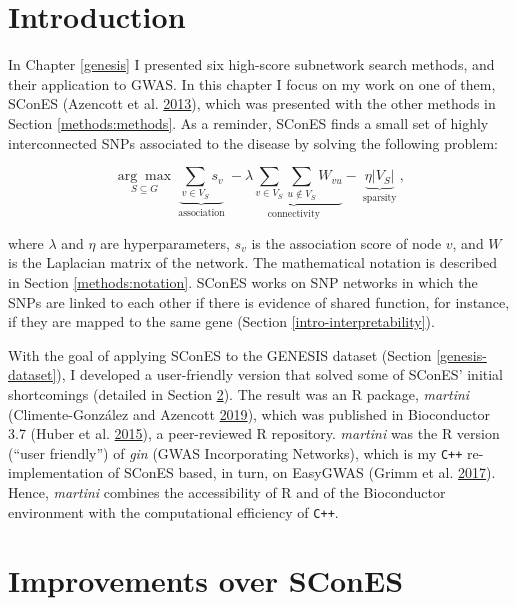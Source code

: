 \documentclass[
  11pt,
]{env/yjiao}
\begin{document}
\hypertarget{introduction-1}{%
\section{Introduction}\label{introduction-1}}

In Chapter \ref{genesis} I presented six high-score subnetwork search methods, and their application to GWAS. In this chapter I focus on my work on one of them, SConES (Azencott et al. \protect\hyperlink{ref-azencott_efficient_2013}{2013}), which was presented with the other methods in Section \ref{methods:methods}. As a reminder, SConES finds a small set of highly interconnected SNPs associated to the disease by solving the following problem:

\begin{equation}
\underset{S \subseteq G}{\arg \max } \underbrace{\sum_{v \in V_S} s_v}_{\text { association }}-\underbrace{\lambda \sum_{v \in V_S} \sum_{u \not\in V_S} W_{vu} }_{\text { connectivity }}-\underbrace{\eta \lvert V_S \rvert }_{\text { sparsity }},
\end{equation}

where \(\lambda\) and \(\eta\) are hyperparameters, \(s_v\) is the association score of node \(v\), and \(W\) is the Laplacian matrix of the network. The mathematical notation is described in Section \ref{methods:notation}. SConES works on SNP networks in which the SNPs are linked to each other if there is evidence of shared function, for instance, if they are mapped to the same gene (Section \ref{intro-interpretability}).

With the goal of applying SConES to the GENESIS dataset (Section \ref{genesis-dataset}), I developed a user-friendly version that solved some of SConES' initial shortcomings (detailed in Section \ref{martini-improvements}). The result was an R package, \emph{martini} (Climente-González and Azencott \protect\hyperlink{ref-martini}{2019}), which was published in Bioconductor 3.7 (Huber et al. \protect\hyperlink{ref-bioconductor}{2015}), a peer-reviewed R repository. \emph{martini} was the R version (``user friendly'') of \emph{gin} (GWAS Incorporating Networks), which is my \verb!C++! re-implementation of SConES based, in turn, on EasyGWAS (Grimm et al. \protect\hyperlink{ref-grimm_easygwas_2017}{2017}). Hence, \emph{martini} combines the accessibility of R and of the Bioconductor environment with the computational efficiency of \verb!C++!.

\hypertarget{martini-improvements}{%
\section{Improvements over SConES}\label{martini-improvements}}
\end{document}
